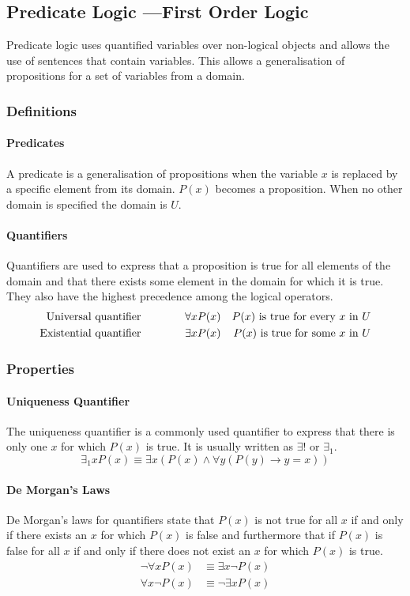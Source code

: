 \documentclass[a4paper, 10pt]{article}
\begin{document}
\newpage
\subsection[Predicate Logic]{Predicate Logic {\large ---First Order Logic}}
Predicate logic uses quantified variables over non-logical objects and allows the use of sentences that contain variables. This allows a generalisation of propositions for a set of variables from a domain.

\subsubsection{Definitions}
\paragraph{Predicates}
A predicate is a generalisation of propositions when the variable \(x\) is replaced by a specific element from its domain. \(P(x)\) becomes a proposition. When no other domain is specified the domain is \(U\).

\paragraph{Quantifiers}
Quantifiers are used to express that a proposition is true for all elements of the domain and that there exists some element in the domain for which it is true. They also have the highest precedence among the logical operators.
\begin{align*}
    \text{Universal quantifier\quad\quad\quad\quad} & \forall xP(x) & P(x)\text{ is true for every \(x\) in \(U\)} \\
    \text{Existential quantifier\quad\quad\quad\quad} & \exists xP(x) & P(x)\text{ is true for some \(x\) in \(U\)}
\end{align*}

\subsubsection{Properties}
\paragraph{Uniqueness Quantifier}
The uniqueness quantifier is a commonly used quantifier to express that there is only one \(x\) for which \(P(x)\) is true. It is usually written as \(\exists !\) or \(\exists_1\).
\[\exists_1xP(x)\equiv\exists x(P(x)\land\forall y(P(y)\rightarrow y=x))\]
\paragraph{De Morgan's Laws}
De Morgan's laws for quantifiers state that \(P(x)\) is not true for all \(x\) if and only if there exists an \(x\) for which \(P(x)\) is false and furthermore that if \(P(x)\) is false for all \(x\) if and only if there does not exist an \(x\) for which \(P(x)\) is true.
\begin{align*}
    \neg\forall x P(x) &\equiv \exists x\neg P(x)\\
    \forall x\neg P(x) &\equiv \neg\exists x P(x)
\end{align*}
\end{document}

